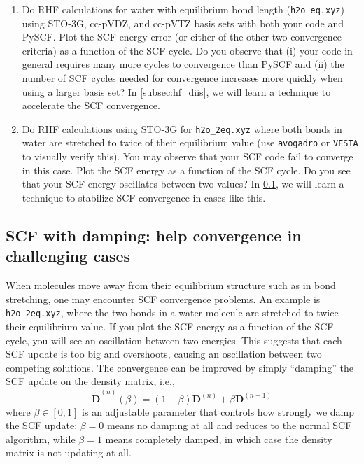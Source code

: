 \documentclass[parskip=full]{article}
\begin{document}
    \begin{enumerate}
        \item Do RHF calculations for water with equilibrium bond length (\texttt{h2o\_eq.xyz}) using STO-3G, cc-pVDZ, and cc-pVTZ basis sets with both your code and PySCF.
        Plot the SCF energy error (or either of the other two convergence criteria) as a function of the SCF cycle.
        Do you observe that (i) your code in general requires many more cycles to convergence than PySCF and (ii) the number of SCF cycles needed for convergence increases more quickly when using a larger basis set?
        In \cref{subsec:hf_diis}, we will learn a technique to accelerate the SCF convergence.

        \item Do RHF calculations using STO-3G for \texttt{h2o\_2eq.xyz} where both  bonds in water are stretched to twice of their equilibrium value (use \texttt{avogadro} or \texttt{VESTA} to visually verify this).
        You may observe that your SCF code fail to converge in this case.
        Plot the SCF energy as a function of the SCF cycle.
        Do you see that your SCF energy oscillates between two values?
        In \cref{subsec:hf_damping}, we will learn a technique to stabilize SCF convergence in cases like this.
    \end{enumerate}


    \subsection{SCF with damping: help convergence in challenging cases}
    \label{subsec:hf_damping}

    When molecules move away from their equilibrium structure such as in bond stretching, one may encounter SCF convergence problems.
    An example is \texttt{h2o\_2eq.xyz}, where the two  bonds in a water molecule are stretched to twice their equilibrium value.
    If you plot the SCF energy as a function of the SCF cycle, you will see an oscillation between two energies.
    This suggests that each SCF update is too big and overshoots, causing an oscillation between two competing solutions.
    The convergence can be improved by simply ``damping'' the SCF update on the density matrix, i.e.,
    \begin{equation}    \label{eq:rdm1_damp}
        \tilde{\mathbf{D}}^{(n)}(\beta)
            = (1-\beta) \mathbf{D}^{(n)} + \beta \mathbf{D}^{(n-1)}
    \end{equation}
    where $\beta \in [0,1]$ is an adjustable parameter that controls how strongly we damp the SCF update: $\beta = 0$ means no damping at all and reduces to the normal SCF algorithm, while $\beta = 1$ means completely damped, in which case the density matrix is not updating at all.
\end{document}
